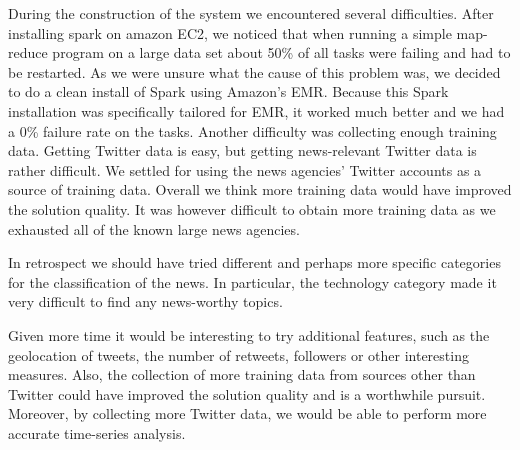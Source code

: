 \documentclass{llncs}
\begin{document}
During the construction of the system we encountered several difficulties. After installing spark on amazon EC2, we noticed that when running a simple map-reduce program on a large data set about 50\% of all tasks were failing and had to be restarted. As we were unsure what the cause of this problem was, we decided to do a clean install of Spark using Amazon's EMR. Because this Spark installation was specifically tailored for EMR, it worked much better and we had a 0\% failure rate on the tasks. Another difficulty was collecting enough training data. Getting Twitter data is easy, but getting news-relevant Twitter data is rather difficult. We settled for using the news agencies' Twitter accounts as a source of training data. Overall we think more training data would have improved the solution quality. It was however difficult to obtain more training data as we exhausted all of the known large news agencies.

In retrospect we should have tried different and perhaps more specific categories for the classification of the news. In particular, the technology category made it very difficult to find any news-worthy topics.

Given more time it would be interesting to try additional features, such as the geolocation of tweets, the number of retweets, followers or other interesting measures. Also, the collection of more training data from sources other than Twitter could have improved the solution quality and is a worthwhile pursuit. Moreover, by collecting more Twitter data, we would be able to perform more accurate time-series analysis.



\end{document}
